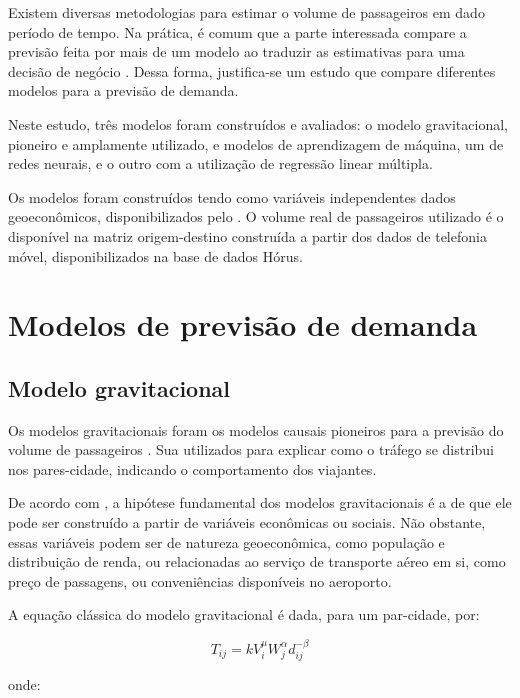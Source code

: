 \documentclass[12pt]{article}
\begin{document}
Existem diversas metodologias para estimar o volume de passageiros em
dado período de tempo. Na prática, é comum que a parte interessada
compare a previsão feita por mais de um modelo ao traduzir as
estimativas para uma decisão de negócio \citep{Grosche2007}. Dessa
forma, justifica-se um estudo que compare diferentes modelos para a
previsão de demanda.

Neste estudo, três modelos foram construídos e avaliados: o modelo
gravitacional, pioneiro e amplamente utilizado, e modelos de
aprendizagem de máquina, um de redes neurais, e o outro com a utilização
de regressão linear múltipla.

Os modelos foram construídos tendo como variáveis independentes dados
geoeconômicos, disponibilizados pelo \citet{atlasIpea}. O volume real de
passageiros utilizado é o disponível na matriz origem-destino construída
a partir dos dados de telefonia móvel, disponibilizados na base de dados
Hórus.

\hypertarget{modelos-de-previsuxe3o-de-demanda}{%
\section{Modelos de previsão de
demanda}\label{modelos-de-previsuxe3o-de-demanda}}

\hypertarget{modelo-gravitacional}{%
\subsection{Modelo gravitacional}\label{modelo-gravitacional}}

Os modelos gravitacionais foram os modelos causais pioneiros para a
previsão do volume de passageiros \citep{Grosche2007}. Sua utilizados
para explicar como o tráfego se distribui nos pares-cidade, indicando o
comportamento dos viajantes.

De acordo com \citet{Grosche2007}, a hipótese fundamental dos modelos
gravitacionais é a de que ele pode ser construído a partir de variáveis
econômicas ou sociais. Não obstante, essas variáveis podem ser de
natureza geoeconômica, como população e distribuição de renda, ou
relacionadas ao serviço de transporte aéreo em si, como preço de
passagens, ou conveniências disponíveis no aeroporto.

A equação clássica do modelo gravitacional é dada, para um par-cidade,
por:

\[T_{ij} = k V_i^\mu W_j^\alpha d_{ij}^{-\beta} \]

onde:
\end{document}
